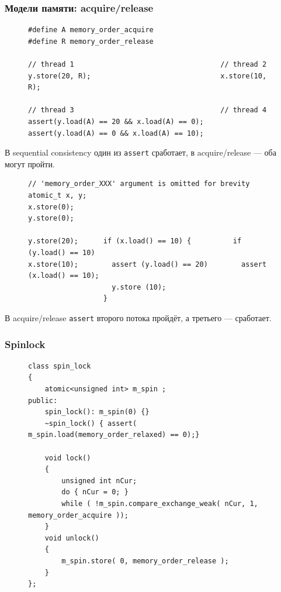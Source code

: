 \documentclass[aspectratio=169, pdf, 8pt, unicode]{beamer}
\begin{document}
\begin{frame}[fragile]
\frametitle{Модели памяти: acquire/release}
\begin{figure}[H]
\begin{BVerbatim}
#define A memory_order_acquire
#define R memory_order_release

// thread 1                                   // thread 2
y.store(20, R);                               x.store(10, R);

// thread 3                                   // thread 4
assert(y.load(A) == 20 && x.load(A) == 0);    assert(y.load(A) == 0 && x.load(A) == 10); 
\end{BVerbatim}
\end{figure}

В sequential consistency один из \texttt{assert} сработает, в acquire/release --- оба могут пройти.

\begin{figure}[H]
\begin{BVerbatim}
// 'memory_order_XXX' argument is omitted for brevity
atomic_t x, y;
x.store(0);
y.store(0);

y.store(20);      if (x.load() == 10) {          if (y.load() == 10)
x.store(10);        assert (y.load() == 20)        assert (x.load() == 10);
                    y.store (10);
                  }
\end{BVerbatim}
\end{figure}

В acquire/release \texttt{assert} второго потока пройдёт, а третьего --- сработает.

\end{frame}

\begin{frame}[fragile]
\frametitle{Spinlock}
\begin{figure}[H]
\centering
\begin{minipage}{0.8\textwidth}
\begin{verbatim}
class spin_lock 
{
    atomic<unsigned int> m_spin ;
public:
    spin_lock(): m_spin(0) {}
    ~spin_lock() { assert( m_spin.load(memory_order_relaxed) == 0);}

    void lock()
    {
        unsigned int nCur;
        do { nCur = 0; }
        while ( !m_spin.compare_exchange_weak( nCur, 1, memory_order_acquire ));
    }
    void unlock()
    {
        m_spin.store( 0, memory_order_release );
    }
};
\end{verbatim}
\end{minipage}
\end{figure}
\end{frame}
\end{document}
